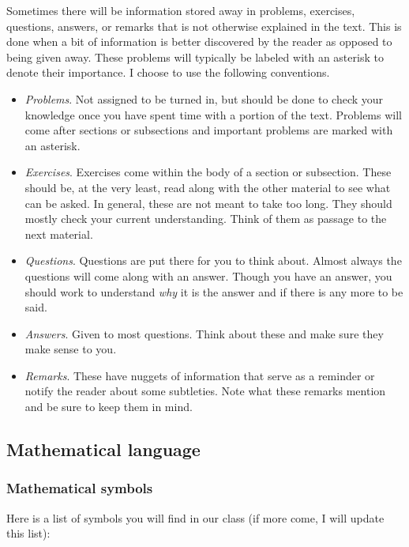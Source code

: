     Sometimes there will be information stored away in problems, exercises, questions, answers, or remarks that is not otherwise explained in the text.  This is done when a bit of information is better discovered by the reader as opposed to being given away.  These problems will typically be labeled with an asterisk to denote their importance. I choose to use the following conventions.
    \begin{itemize}
        \item \emph{Problems}. Not assigned to be turned in, but should be done to check your knowledge once you have spent time with a portion of the text.  Problems will come after sections or subsections and important problems are marked with an asterisk.
        \item \emph{Exercises}. Exercises come within the body of a section or subsection. These should be, at the very least, read along with the other material to see what can be asked. In general, these are not meant to take too long. They should mostly check your current understanding. Think of them as passage to the next material.
        \item \emph{Questions}. Questions are put there for you to think about.  Almost always the questions will come along with an answer. Though you have an answer, you should work to understand \emph{why} it is the answer and if there is any more to be said.
        \item \emph{Answers}. Given to most questions. Think about these and make sure they make sense to you.
        \item \emph{Remarks}. These have nuggets of information that serve as a reminder or notify the reader about some subtleties. Note what these remarks mention and be sure to keep them in mind.
    \end{itemize}
    
    \subsection{Mathematical language}
    
    \subsubsection{Mathematical symbols}

    Here is a list of symbols you will find in our class (if more come, I will update this list):

